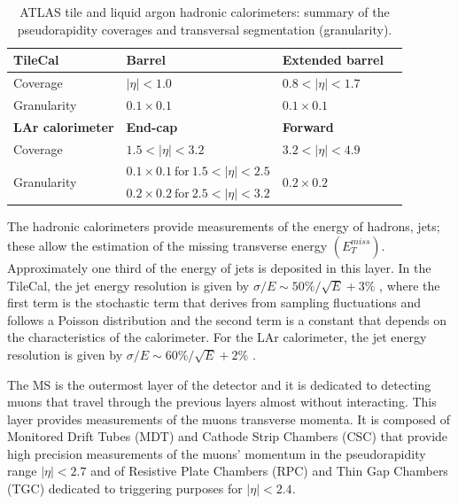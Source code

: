 \begin{table}
	\centering
	\caption{ATLAS tile and liquid argon hadronic calorimeters: summary of the pseudorapidity coverages and transversal segmentation (granularity).}
	\begin{tabular}{llll}
		\toprule 
		\textbf{TileCal} & \textbf{Barrel} & \textbf{Extended barrel} &\\
		\midrule
		\rowcolor{black!7}Coverage & $|\eta|<1.0$ & $0.8<|\eta|<1.7$  & \\
		Granularity & $0.1\times 0.1$ & $0.1\times 0.1$ & \\
		\midrule \midrule
		\textbf{LAr calorimeter} & \textbf{End-cap} & \textbf{Forward} &\\
		\midrule
		\rowcolor{black!7}Coverage & $1.5<|\eta|<3.2$ & $3.2<|\eta|<4.9$  &  \\
		\multirow{2}{*}{Granularity} & $0.1\times 0.1 ~\text{for}~ 1.5<|\eta|<2.5$ & \multirow{2}{*}{$0.2\times 0.2$} & \\
		& $0.2\times 0.2 ~\text{for}~ 2.5<|\eta|<3.2$ & & \\
		\bottomrule
	\end{tabular}
	\label{table:ATLAS_HCAL}
\end{table}

The hadronic calorimeters provide measurements of the energy of hadrons, jets; these allow the estimation of the missing transverse energy $\left(E_T^{miss}\right)$. Approximately one third of the energy of jets is deposited in this layer. In the TileCal, the jet energy resolution is given by $\sigma/E\sim 50\%/\sqrt{E}+3\%$ \cite{TileCalTech},
where the first term is the stochastic term that derives from sampling fluctuations and follows a Poisson distribution and the second term is a constant that depends on the characteristics of the calorimeter. For the LAr calorimeter, the jet energy resolution is given by $\sigma/E\sim 60\%/\sqrt{E}+2\%$ \cite{ATLAS_LAr_TDR}.

The MS is the outermost layer of the detector and it is dedicated to detecting muons that travel through the previous layers almost without interacting. This layer provides measurements of the muons transverse momenta. It is composed of Monitored Drift Tubes (MDT) and Cathode Strip Chambers (CSC) that provide high precision measurements of the muons' momentum in the pseudorapidity range $|\eta|<2.7$ and of Resistive Plate Chambers (RPC) and Thin Gap Chambers (TGC) dedicated to triggering purposes for $|\eta|<2.4$.

